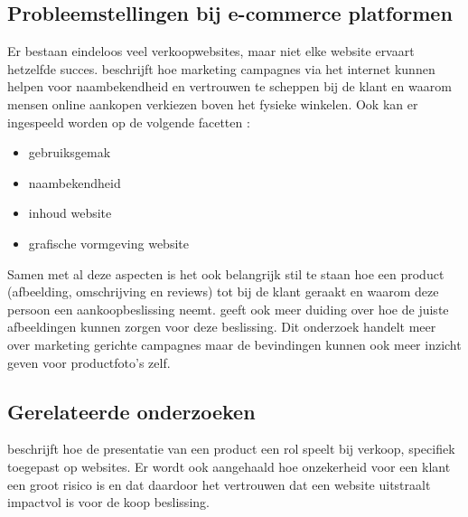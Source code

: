 %



\subsection{Probleemstellingen bij e-commerce platformen}
Er bestaan eindeloos veel verkoopwebsites, maar niet elke website ervaart hetzelfde succes. \cite{Kaur2017} beschrijft hoe marketing campagnes via het internet kunnen helpen voor naambekendheid en vertrouwen te scheppen bij de klant en waarom mensen online aankopen verkiezen boven het fysieke winkelen. Ook kan er ingespeeld worden op de volgende facetten \autocite{Stringham2010}: 
\begin{itemize}
	\item gebruiksgemak
	\item naambekendheid
	\item inhoud website
	\item grafische vormgeving website
\end{itemize}

Samen met al deze aspecten is het ook belangrijk stil te staan hoe een product (afbeelding, omschrijving en reviews) tot bij de klant geraakt en waarom deze persoon een aankoopbeslissing neemt. \cite{Smaoui2017} geeft ook meer duiding over hoe de juiste afbeeldingen kunnen zorgen voor deze beslissing. Dit onderzoek handelt meer over marketing gerichte campagnes maar de bevindingen kunnen ook meer inzicht geven voor productfoto's zelf.

\subsection{Gerelateerde onderzoeken}
\cite{Mary2018} beschrijft hoe de presentatie van een product een rol speelt bij verkoop, specifiek toegepast op websites. Er wordt ook aangehaald hoe onzekerheid voor een klant een groot risico is en dat daardoor het vertrouwen dat een website uitstraalt impactvol is voor de koop beslissing. 

